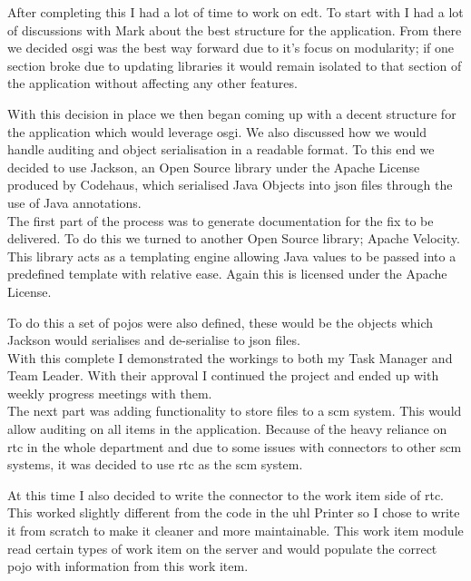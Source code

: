 \documentclass[a4paper,11pt]{report}
\begin{document}
After completing this I had a lot of time to work on \gls{edt}. To start with I had a lot of 
discussions with Mark about the best structure for the application. From there we decided
\gls{osgi} was the best way forward due to it's focus on modularity; if one section broke due to
updating libraries it would remain isolated to that section of the application without affecting
any other features.

With this decision in place we then began coming up with a decent structure for the application
which would leverage \gls{osgi}. We also discussed how we would handle auditing and object 
serialisation in a readable format. To this end we decided to use Jackson, an Open Source library
under the Apache License produced by Codehaus, which serialised Java Objects into \gls{json} files
through the use of Java annotations. \\



The first part of the process was to generate documentation for the fix to be delivered. To do this
we turned to another Open Source library; Apache Velocity. This library acts as a templating engine
allowing Java values to be passed into a predefined template with relative ease. Again this is
licensed under the Apache License.

To do this a set of \gls{pojo}s were also defined, these would be the objects which Jackson would
serialises and de-serialise to \gls{json} files. \\



With this complete I demonstrated the workings to both my Task Manager and Team Leader. With their
approval I continued the project and ended up with weekly progress meetings with them. \\



The next part was adding functionality to store files to a \gls{scm} system. This would allow 
auditing on all items in the application. Because of the heavy reliance on \gls{rtc} in the whole
department and due to some issues with connectors to other \gls{scm} systems, it was decided to use
\gls{rtc} as the \gls{scm} system.

At this time I also decided to write the connector to the work item side of \gls{rtc}. This worked
slightly different from the code in the \gls{uhl} Printer so I chose to write it from scratch to
make it cleaner and more maintainable. This work item module read certain types of work item on the
server and would populate the correct \gls{pojo} with information from this work item. \\
\end{document}
